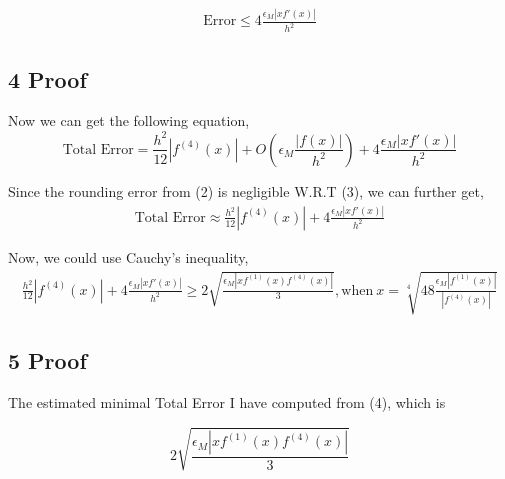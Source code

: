 \documentclass{article}
\begin{document}
\[
\begin{split}
\text{Error} \le 4\frac{\epsilon_M |xf'(x)|}{h^2}
\end{split}
\]
\subsection*{4 Proof}
Now we can get the following equation,
$$\text{Total Error} = \frac{h^2}{12}|f^{(4)}(x)| + O(\epsilon_M\frac{|f(x)|}{h^2}) +4\frac{\epsilon_M |xf'(x)|}{h^2}$$

Since the rounding error from (2) is negligible W.R.T (3), we can further get,
\[
\begin{split}
\text{Total Error} \approx \frac{h^2}{12}|f^{(4)}(x)| + 4\frac{\epsilon_M |xf'(x)|}{h^2}
\end{split}
\]

Now, we could use Cauchy's inequality,
\[
\begin{split}
\frac{h^2}{12}|f^{(4)}(x)| + 4\frac{\epsilon_M |xf'(x)|}{h^2} \ge 2\sqrt{\frac{\epsilon_M|xf^{(1)}(x)f^{(4)}(x)|}{3}}, \text{when} \ x =  \sqrt[4]{48\frac{\epsilon_M|f^{(1)}(x)|}{|f^{(4)}(x)|}}
\end{split}
\]
\subsection*{5 Proof}

The estimated minimal Total Error I have computed from (4), which is

$$2\sqrt{\frac{\epsilon_M|xf^{(1)}(x)f^{(4)}(x)|}{3}}$$
\end{document}

